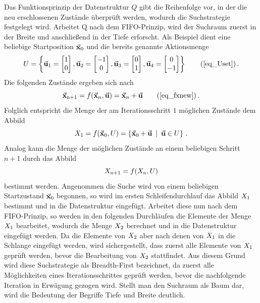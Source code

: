 Das Funktionsprinzip der Datenstruktur $Q$ gibt die Reihenfolge vor, in der die neu erschlossenen Zustände überprüft werden, wodurch die Suchstrategie festgelegt wird. Arbeitet Q nach dem FIFO-Prinzip, wird der Suchraum zuerst in der Breite und anschließend in der Tiefe erforscht. Als Beispiel dient eine beliebige Startposition $\vec{\mathbf{x}}_{\text{0}}$ und die bereits genannte Aktionsmenge
\begin{equation}
U = \left\{ 
\mVec{u}\idx{1} = \begin{bmatrix} 1 \\ 0 \end{bmatrix}, 
\mVec{u}\idx{2} = \begin{bmatrix} -1 \\ 0 \end{bmatrix},
\mVec{u}\idx{3} = \begin{bmatrix} 0 \\ 1 \end{bmatrix},
\mVec{u}\idx{4} = \begin{bmatrix} 0 \\ -1\end{bmatrix} \right\}\tag{\ref{eq_Uset}}\,.
\end{equation}
Die folgenden Zustände ergeben sich nach
\begin{equation}
\mVec{x}\idx{n+1} = f(\mVec{x}_n, \mVec{u}) = \mVec{x}_n + \mVec{u}\tag{\ref{eq_fxnew}}\,.
\end{equation}
Folglich entspricht die Menge der am Iterationsschritt $1$ möglichen Zustände dem Abbild
\begin{equation}
X_{\text{1}} = f(\vec{\mathbf{x}}_{\text{0}}, U) = \left\{ \vec{\mathbf{x}}_{\text{0}}+\vec{\mathbf{u}} \hspace{5pt}\vert \hspace{5pt} \vec{\mathbf{u}} \in U \right\}\,.
\end{equation}
Analog kann die Menge der möglichen Zustände an einem beliebigen Schritt $n+1$ durch das Abbild
\begin{equation}
X_{\text{n+1}} = f(X_{\text{n}}, U)
\end{equation}
bestimmt werden.
Angenommen die Suche wird von einem beliebigen Startzustand $\vec{\mathbf{x}}_{\text{0}}$ begonnen, so wird im ersten Schleifendurchlauf das Abbild $X_{\text{1}}$ bestimmt und in die Datenstruktur eingefügt. Arbeitet diese nun nach dem FIFO-Prinzip, so werden in den folgenden Durchläufen die Elemente der Menge $X_{\text{1}}$ bearbeitet, wodurch die Menge $X_{\text{2}}$ berechnet und in die Datenstruktur eingefügt werden. Da die Elemente von $X_{\text{2}}$ aber nach denen von $X_{\text{1}}$ in die Schlange eingefügt werden, wird sichergestellt, dass zuerst alle Elemente von $X_{\text{1}}$ geprüft werden, bevor die Bearbeitung von $X_{\text{2}}$ stattfindet. Aus diesem Grund wird diese Suchstrategie als Breadth-First bezeichnet, da zuerst alle Möglichkeiten eines Iterationsschrittes geprüft werden, bevor die nachfolgende Iteration in Erwägung gezogen wird. Stellt man den Suchraum als Baum dar, wird die Bedeutung der Begriffe Tiefe und Breite deutlich.
